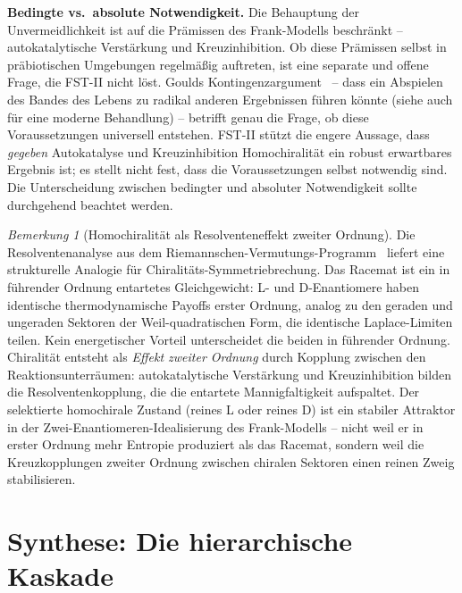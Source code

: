 \documentclass[12pt,a4paper]{article}
\theoremstyle{remark}
\newtheorem{remark}{Bemerkung}
\begin{document}
\textbf{Bedingte vs.\ absolute Notwendigkeit.} Die Behauptung der \glqq Unvermeidlichkeit\grqq{} ist auf die Prämissen des Frank-Modells beschränkt -- autokatalytische Verstärkung und Kreuzinhibition. Ob diese Prämissen selbst in präbiotischen Umgebungen regelmäßig auftreten, ist eine separate und offene Frage, die FST-II nicht löst. Goulds Kontingenzargument~\citep{Gould1989} -- dass ein Abspielen des Bandes des Lebens zu radikal anderen Ergebnissen führen könnte (siehe auch \citet{UnbecomingBeing} für eine moderne Behandlung) -- betrifft genau die Frage, ob diese Voraussetzungen universell entstehen. FST-II stützt die engere Aussage, dass \emph{gegeben} Autokatalyse und Kreuzinhibition Homochiralität ein robust erwartbares Ergebnis ist; es stellt nicht fest, dass die Voraussetzungen selbst notwendig sind. Die Unterscheidung zwischen bedingter und absoluter Notwendigkeit sollte durchgehend beachtet werden.

\begin{remark}[Homochiralität als Resolventeneffekt zweiter Ordnung]
\label{rem:chirality-resolvent}
Die Resolventenanalyse aus dem Riemannschen-Vermutungs-Programm~\citep{GeigerRH2026b} liefert eine strukturelle Analogie für Chiralitäts-Symmetriebrechung. Das Racemat ist ein in führender Ordnung entartetes Gleichgewicht: L- und D-Enantiomere haben identische thermodynamische Payoffs erster Ordnung, analog zu den geraden und ungeraden Sektoren der Weil-quadratischen Form, die identische Laplace-Limiten teilen. Kein energetischer Vorteil unterscheidet die beiden in führender Ordnung. Chiralität entsteht als \emph{Effekt zweiter Ordnung} durch Kopplung zwischen den Reaktionsunterräumen: autokatalytische Verstärkung und Kreuzinhibition bilden die Resolventenkopplung, die die entartete Mannigfaltigkeit aufspaltet. Der selektierte homochirale Zustand (reines L oder reines D) ist ein stabiler Attraktor in der Zwei-Enantiomeren-Idealisierung des Frank-Modells -- nicht weil er in erster Ordnung mehr Entropie produziert als das Racemat, sondern weil die Kreuzkopplungen zweiter Ordnung zwischen chiralen Sektoren einen reinen Zweig stabilisieren.
\end{remark}

\section{Synthese: Die hierarchische Kaskade}
\label{sec:synthesis}
\end{document}
